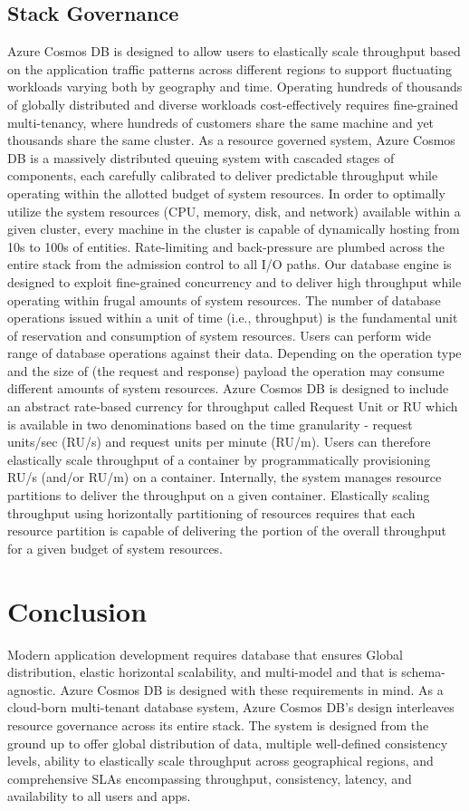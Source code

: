 \subsection{Stack Governance}
Azure Cosmos DB is designed to allow users to elastically scale
throughput based on the application traffic patterns across different
regions to support fluctuating workloads varying both by geography and
time. Operating hundreds of thousands of globally distributed and
diverse workloads cost-effectively requires fine-grained
multi-tenancy, where hundreds of customers share the same machine and
yet thousands share the same cluster. As a resource governed system,
Azure Cosmos DB is a massively distributed queuing system with
cascaded stages of components, each carefully calibrated to deliver
predictable throughput while operating within the allotted budget of
system resources. In order to optimally utilize the system resources
(CPU, memory, disk, and network) available within a given cluster,
every machine in the cluster is capable of dynamically hosting from
10s to 100s of entities. Rate-limiting and back-pressure are plumbed
across the entire stack from the admission control to all I/O
paths. Our database engine is designed to exploit fine-grained
concurrency and to deliver high throughput while operating within
frugal amounts of system resources.  The number of database operations
issued within a unit of time (i.e., throughput) is the fundamental
unit of reservation and consumption of system resources. Users can
perform wide range of database operations against their
data. Depending on the operation type and the size of (the request and
response) payload the operation may consume different amounts of
system resources. Azure Cosmos DB is designed to include an abstract
rate-based currency for throughput called Request Unit or RU which is
available in two denominations based on the time granularity - request
units/sec (RU/s) and request units per minute (RU/m). Users can
therefore elastically scale throughput of a container by
programmatically provisioning RU/s (and/or RU/m) on a
container. Internally, the system manages resource partitions to
deliver the throughput on a given container. Elastically scaling
throughput using horizontally partitioning of resources requires that
each resource partition is capable of delivering the portion of the
overall throughput for a given budget of system resources.

\section{Conclusion}
Modern application development requires database that ensures Global
distribution, elastic horizontal scalability, and multi-model and that
is schema-agnostic. Azure Cosmos DB is designed with these
requirements in mind. As a cloud-born multi-tenant database system,
Azure Cosmos DB’s design interleaves resource governance across its
entire stack. The system is designed from the ground up to offer
global distribution of data, multiple well-defined consistency levels,
ability to elastically scale throughput across geographical regions,
and comprehensive SLAs encompassing throughput, consistency, latency,
and availability to all users and apps.

